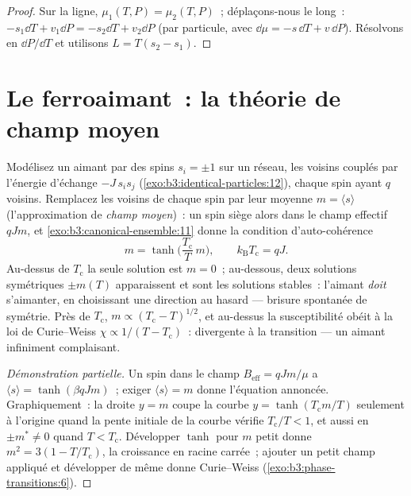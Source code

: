 \begin{proof}
Sur la ligne, $\mu_1(T, P) = \mu_2(T, P)$~; déplaçons-nous le long~:
$-s_1\dd T + v_1\dd P = -s_2\dd T + v_2\dd P$ (par particule, avec
$\dd\mu = -s\,\dd T + v\,\dd P$). Résolvons en $\dd P/\dd T$ et
utilisons $L = T(s_2 - s_1)$.
\end{proof}

\section{Le ferroaimant~: la théorie de champ moyen}

\begin{theorem}\label{thm:b3:phase-transitions:meanfield}
Modélisez un aimant par des spins $s_i = \pm1$ sur un réseau, les
voisins couplés par l'énergie d'échange $-J\,s_is_j$
(\cref{exo:b3:identical-particles:12}), chaque spin ayant $q$
voisins. Remplacez les voisins de chaque spin par leur moyenne $m =
\langle s\rangle$ (l'approximation de \emph{champ moyen})~: un spin
siège alors dans le champ effectif $qJm$, et
\cref{exo:b3:canonical-ensemble:11} donne la condition
d'auto-cohérence
\[
m = \tanh\!\Big(\frac{T_{\text{c}}}{T}\,m\Big) , \qquad
k_{\text{B}}T_{\text{c}} = qJ .
\]
Au-dessus de $T_{\text{c}}$ la seule solution est $m = 0$~;
au-dessous, deux solutions symétriques $\pm m(T)$ apparaissent et
sont les solutions stables~: l'aimant \emph{doit} s'aimanter, en
choisissant une direction au hasard --- brisure spontanée de
symétrie. Près de $T_{\text{c}}$, $m \propto
(T_{\text{c}} - T)^{1/2}$, et au-dessus la susceptibilité obéit à
la loi de Curie--Weiss $\chi \propto 1/(T - T_{\text{c}})$~:
divergente à la transition --- un aimant infiniment complaisant.
\end{theorem}

\begin{proof}[Démonstration partielle]
Un spin dans le champ $B_{\text{eff}} = qJm/\mu$ a $\langle s\rangle =
\tanh(\beta qJm)$~; exiger $\langle s\rangle = m$ donne l'équation
annoncée. Graphiquement~: la droite $y = m$ coupe la courbe $y =
\tanh(T_{\text{c}}m/T)$ seulement à l'origine quand la pente
initiale de la courbe vérifie $T_{\text{c}}/T < 1$, et aussi en
$\pm m^* \neq 0$ quand $T < T_{\text{c}}$. Développer $\tanh$ pour
$m$ petit donne $m^2 = 3(1 - T/T_{\text{c}})$, la croissance en
racine carrée~; ajouter un petit champ appliqué et développer de
même donne Curie--Weiss (\cref{exo:b3:phase-transitions:6}).
\end{proof}

